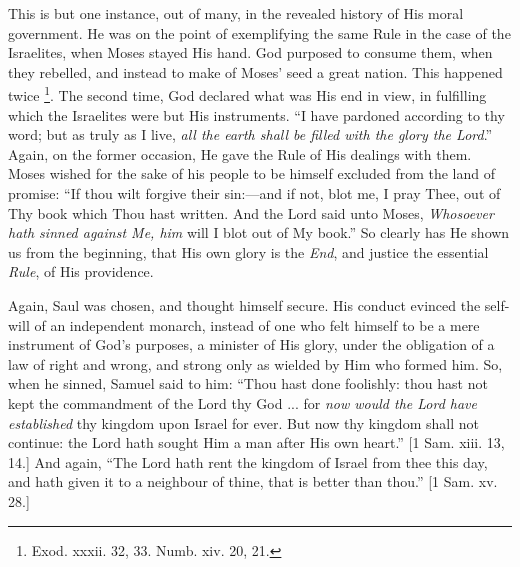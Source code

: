 This is but one instance, out of many, in the revealed history of His
moral government. He was on the point of exemplifying the same Rule in
the case of the Israelites, when Moses stayed His hand. God purposed to
consume them, when they rebelled, and instead to make of Moses' seed a
great nation. This happened twice \footnote{Exod. xxxii. 32, 33. Numb. xiv. 20, 21.}. The second time, God declared what was His end in view, in
fulfilling which the Israelites were but His instruments. ``I have
pardoned according to thy word; but as truly as I live, \emph{all the earth
shall be filled with the glory the Lord}.'' Again, on the former
occasion, He gave the Rule of His dealings with them. Moses wished for
the sake of his people to be himself excluded from the land of promise:
``If thou wilt forgive their sin:—and if not, blot me, I pray
Thee, out of Thy book which Thou hast written. And the Lord said unto
Moses, \emph{Whosoever hath sinned against Me, him} will I blot out of
My book.'' So clearly has He shown us from the beginning, that His
own glory is the \emph{End}, and justice the essential \emph{Rule}, of
His providence.

Again, Saul was chosen, and thought himself secure. His conduct
evinced the self-will of an independent monarch, instead of one who felt
himself to be a mere instrument of God's purposes, a minister of His
glory, under the obligation of a law of right and wrong, and strong only
as wielded by Him who formed him. So, when he sinned, Samuel said to
him: ``Thou hast done foolishly: thou hast not kept the commandment
of the Lord thy God ... for \emph{now would the Lord have established}
thy kingdom upon Israel for ever. But now thy kingdom shall not
continue: the Lord hath sought Him a man after His own heart.'' [1
Sam. xiii. 13, 14.] And again, ``The Lord hath rent the kingdom of
Israel from thee this day, and hath given it to a neighbour of thine,
that is better than thou.'' [1 Sam. xv. 28.]

